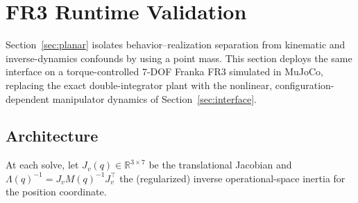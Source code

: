 \documentclass[journal]{IEEEtran}
\begin{document}
\section{FR3 Runtime Validation}
\label{sec:fr3}

Section~\ref{sec:planar} isolates behavior--realization separation from
kinematic and inverse-dynamics confounds by using a point mass. This
section deploys the same interface on a torque-controlled 7-DOF Franka
FR3 simulated in MuJoCo, replacing the exact double-integrator plant
with the nonlinear, configuration-dependent manipulator dynamics of
Section~\ref{sec:interface}.

\subsection{Architecture}
\label{sec:fr3-architecture}

At each solve, let $J_v(q)\in\mathbb R^{3\times7}$ be the translational
Jacobian and $\Lambda(q)^{-1}=J_vM(q)^{-1}J_v^\top$ the (regularized)
inverse operational-space inertia for the position coordinate.
\end{document}

